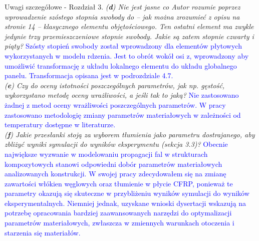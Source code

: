 \documentclass[10pt,aspectratio=169]{beamer} %
\begin{document}
\begin{frame}[label=frame4]{Uwagi szczegółowe - Rozdział 3.}\justifying
\textit{(\textbf{d}) Nie jest jasne co Autor rozumie poprzez wprowadzenie szóstego stopnia swobody do – jak można zrozumieć z opisu na stronie 14 – klasycznego elementu objętościowego. Ten	ostatni element ma zwykle jedynie trzy przemieszczeniowe stopnie swobody. Jakie są zatem stopnie czwarty i piąty?} {\textcolor{blue}{Szósty stopień swobody został wprowadzony dla elementów płytowych wykorzystanych w modelu rdzenia. Jest to obrót wokół osi z, wprowadzony aby umożliwić transformację z układu lokalnego elementu do układu globalnego panelu. Transformacja  opisana jest w podrozdziale 4.7.}}\\
\textit{(\textbf{e}) Czy do oceny istotności poszczególnych parametrów, jak np. gęstość, wykorzystano metodę oceny wrażliwości, a jeśli tak to jaką?} \small{\textcolor{blue}{Nie zastosowano żadnej z metod oceny wrażliwości poszczególnych parametrów. W pracy zastosowano metodologię zmiany parametrów materiałowych w zależności od temperatury dostępne w literaturze.}}\\
\textit{(\textbf{f}) Jakie przesłanki stoją za wyborem tłumienia jako parametru dostrajanego, aby zbliżyć	wyniki symulacji do wyników eksperymentu (sekcja 3.3)?} \footnotesize{\textcolor{blue}{Obecnie największe wyzwanie w modelowaniu propagacji fal w strukturach kompozytowych stanowi odpowiedni dobór parametrów materiałowych analizowanych konstrukcji.  W swojej pracy zdecydowałem się na zmianę zawartości włókien węglowych oraz tłumienie w płycie CFRP, ponieważ te parametry okazują się skuteczne w przybliżeniu wyników symulacji do wyników eksperymentalnych. Niemniej jednak, uzyskane wnioski dysertacji wskazują na potrzebę opracowania bardziej zaawansowanych narzędzi do optymalizacji parametrów materiałowych, zwłaszcza w zmiennych warunkach otoczenia i starzenia się materiałów.}}
\end{frame}
\end{document}
